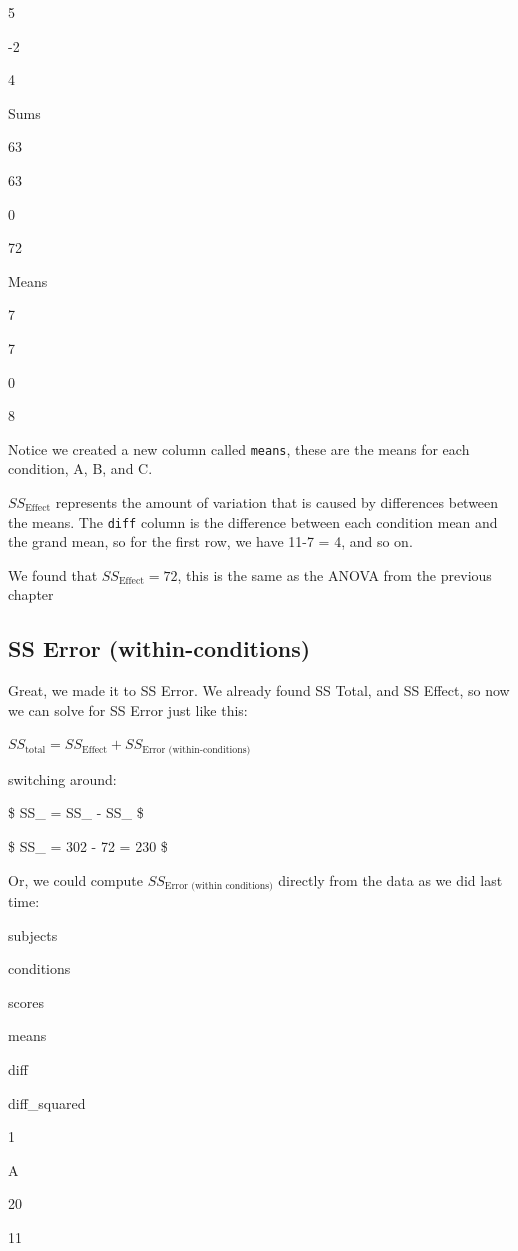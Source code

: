 \documentclass[]{book}
\begin{document}
5

-2

4

Sums

63

63

0

72

Means

7

7

0

8

Notice we created a new column called \texttt{means}, these are the means for each condition, A, B, and C.

\(SS_\text{Effect}\) represents the amount of variation that is caused by differences between the means. The \texttt{diff} column is the difference between each condition mean and the grand mean, so for the first row, we have 11-7 = 4, and so on.

We found that \(SS_\text{Effect} = 72\), this is the same as the ANOVA from the previous chapter

\hypertarget{ss-error-within-conditions}{%
\subsection{SS Error (within-conditions)}\label{ss-error-within-conditions}}

Great, we made it to SS Error. We already found SS Total, and SS Effect, so now we can solve for SS Error just like this:

\(SS_\text{total} = SS_\text{Effect} + SS_\text{Error (within-conditions)}\)

switching around:

\$ SS\_ = SS\_ - SS\_ \$

\$ SS\_ = 302 - 72 = 230 \$

Or, we could compute \(SS_\text{Error (within conditions)}\) directly from the data as we did last time:

subjects

conditions

scores

means

diff

diff\_squared

1

A

20

11
\end{document}
